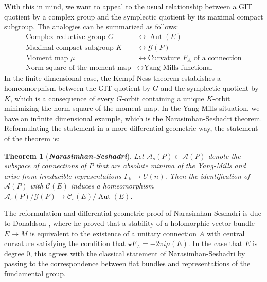 \documentclass[psamsfonts, 12pt]{amsart}
\newtheorem{thm}{Theorem}[section]
\theoremstyle{definition}
\theoremstyle{remark}
\newcommand{\R}{\mathbb{R}}
\newcommand{\ib}[1]{\textbf{\textit{#1}}}
\DeclareMathOperator{\Aut}{Aut}
\begin{document}
With this in mind, we want to appeal to the usual relationship between a GIT
quotient by a complex group and the symplectic quotient by its maximal compact
subgroup. The analogies can be summarized as follows:
\begin{align*}
\text{Complex reductive group } G &\longleftrightarrow \Aut(E) \\
\text{Maximal compact subgroup } K &\longleftrightarrow \mathscr{G}(P) \\
\text{Moment map } \mu &\longleftrightarrow \text{Curvature }
F_A \text{ of a connection} \\
\text{Norm square of the moment map} &\longleftrightarrow \text{Yang-Mills functional}
\end{align*}
%
In the finite dimensional case, the Kempf-Ness theorem establishes a homeomorphism
between the GIT quotient by $G$ and the symplectic quotient by $K$, which is a
consequence of every $G$-orbit containing a unique $K$-orbit minimizing the norm square
of the moment map. In the Yang-Mills situation, we have an infinite dimensional
example, which is the Narasimhan-Seshadri theorem. Reformulating the statement in
a more differential geometric way, the statement of the theorem is:
%
\begin{thm}[\ib{Narasimhan-Seshadri}]
Let $\mathscr{A}_s(P) \subset \mathscr{A}(P)$ denote the subspace of connections of $P$
that are absolute minima of the Yang-Mills and arise from irreducible representations
$\Gamma_\R \to U(n)$. Then the identification of $\mathscr{A}(P)$ with
$\mathscr{C}(E)$ induces a homeomorphism
$\mathscr{A}_s(P)/\mathscr{G}(P) \to \mathscr{C}_s(E)/\Aut(E)$.
\end{thm}
%
The reformulation and differential geometric proof of Narasimhan-Seshadri is due
to Donaldson \cite{donaldson1983}, where he proved that a stability of a holomorphic
vector bundle $E \to M$ is equivalent to the existence of a unitary connection $A$
with central curvature satisfying the condition that $\star F_A = -2\pi i \mu(E)$.
In the case that $E$ is degree $0$, this agrees with the classical statement of
Narasimhan-Seshadri by passing to the correspondence between flat bundles and
representations of the fundamental group. \\
\end{document}
